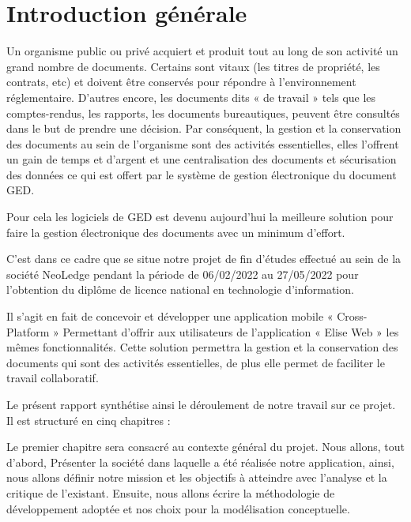 \chapter*{Introduction générale}
\label{chap:introduction}

Un organisme public ou privé acquiert et produit tout au long de son activité un grand nombre de documents. Certains sont vitaux (les titres de propriété, les contrats, etc) et doivent être conservés pour répondre à l'environnement réglementaire. D'autres encore, les documents dits « de travail » tels que les comptes-rendus, les rapports, les documents bureautiques, peuvent être consultés dans le but de prendre une décision. Par conséquent, la gestion et la conservation des documents au sein de l'organisme sont des activités essentielles, elles l'offrent un gain de temps et d'argent et une centralisation des documents et sécurisation des données ce qui est offert par le système de gestion électronique du document GED.
\medskip

Pour cela les logiciels de GED est devenu aujourd'hui la meilleure solution pour faire la gestion électronique des documents avec un minimum d'effort.
\medskip

C'est dans ce cadre que se situe notre projet de fin d'études effectué au sein de la société NeoLedge pendant la période de 06/02/2022 au 27/05/2022 pour l'obtention du diplôme de licence national en technologie d'information.
\medskip

Il s'agit en fait de concevoir et développer une application mobile « Cross-Platform » Permettant d'offrir aux utilisateurs de l'application « Elise Web » les mêmes fonctionnalités. Cette solution permettra la gestion et la conservation des documents qui sont des activités essentielles, de plus elle permet de faciliter le travail collaboratif.

\medskip
Le présent rapport synthétise ainsi le déroulement de notre travail sur ce projet. Il est structuré en cinq chapitres :

\medskip
Le premier chapitre sera consacré au contexte général du projet. Nous allons, tout d'abord, Présenter la société dans laquelle a été réalisée notre application, ainsi, nous allons définir notre mission et les objectifs à atteindre avec l'analyse et la critique de l'existant. Ensuite, nous allons écrire la méthodologie de développement adoptée et nos choix pour la modélisation conceptuelle. 

